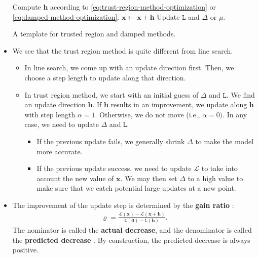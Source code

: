\documentclass[10pt]{article}
\newcommand{\ve}[1]{\mathbf{#1}}
\newcommand{\mcal}[1]{\mathcal{#1}}
\begin{document}
\begin{itemize}
    \begin{algorithm}
        \begin{algorithmic}
                \State Compute $\ve{h}$ according to \eqref{eq:trust-region-method-optimization} or \eqref{eq:damped-method-optimization}.
                \If {$\mcal{L}(x + \ve{h}) < \mcal{L}(\ve{x})$}
                    \State $\ve{x} \gets \ve{x} + \ve{h}$
                \EndIf
                \State Update $\mathtt{L}$ and $\Delta$ or $\mu$.
            \EndWhile
        \end{algorithmic}
        \caption{A template for trusted region and damped methods.}
        \label{algo:trust-region-method}
    \end{algorithm}

    \item We see that the trust region method is quite different from line search.
    \begin{itemize}
        \item In line search, we come up with an update direction first. Then, we choose a step length to update along that direction.
        \item In trust region method, we start with an initial guess of $\Delta$ and $\mathtt{L}$. We find an update direction $\ve{h}$. If $\ve{h}$ results in an improvement, we update along $\ve{h}$ with step length $\alpha = 1$. Otherwise, we do not move (i.e., $\alpha = 0)$. In any case, we need to update $\Delta$ and $\mathtt{L}$.
        \begin{itemize}
            \item If the previous update fails, we generally shrink $\Delta$ to make the model more accurate.
            \item If the previous update success, we need to update $\mathcal{L}$ to take into account the new value of $\ve{x}$. We may then set $\Delta$ to a high value to make sure that we catch potential large updates at a new point.
        \end{itemize}
    \end{itemize}    

    \item The improvement of the update step is determined by the {\bf gain ratio} \cite{Madsen:2004}:
    \begin{align*}
        \varrho = \frac{\mcal{L}(\ve{x}) - \mcal{L}(\ve{x}+\ve{h})}{\mathtt{L}(\ve{0}) - \mathtt{L}(\ve{h})}.
    \end{align*}
    The nominator is called the {\bf actual decrease}, and the denominator is called the {\bf predicted decrease} \cite{Norcedal:2006}. By construction, the predicted decrease is always positive.


\end{itemize}
\end{document}
